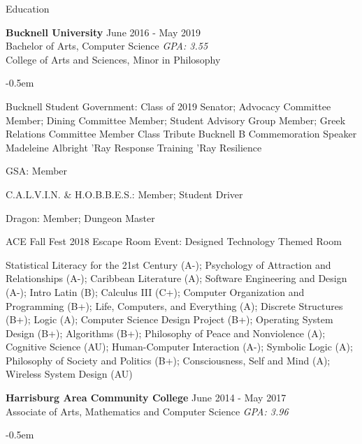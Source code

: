 \documentclass{resume} %
\begin{document}

\begin{rSection}{Education}

{\bf Bucknell University} {June 2016 - May 2019} 
\\ Bachelor of Arts, Computer Science  {\em GPA: 3.55}
\\ College of Arts and Sciences, Minor in Philosophy 
\begin{rSubSection}{}{
   \itemsep -0.5em \vspace{-0.5em} %
 
    \item {Bucknell Student Government:} Class of 2019 Senator; Advocacy Committee Member; Dining Committee Member; Student Advisory Group Member; Greek Relations Committee Member
    \subitem Class Tribute Bucknell B 
    \subitem Commemoration Speaker Madeleine Albright
    \subitem 'Ray Response Training
    \subitem 'Ray Resilience
    \item {GSA:} Member
    \item {C.A.L.V.I.N. \& H.O.B.B.E.S.:} Member; Student Driver
    \item {Dragon:} Member; Dungeon Master
    \item {ACE} 
    \subitem Fall Fest 2018
     Escape Room Event: Designed Technology Themed Room}
    
  \end{rSubSection}
Statistical Literacy for the 21st Century (A-); Psychology of Attraction and Relationships (A-); Caribbean Literature (A); Software Engineering and Design (A-); Intro Latin (B); Calculus III (C+); Computer Organization and Programming (B+); Life, Computers, and Everything (A); Discrete Structures (B+); Logic (A); Computer Science Design Project (B+); Operating System Design (B+); Algorithms (B+); Philosophy of Peace and Nonviolence (A); Cognitive Science (AU); Human-Computer Interaction (A-); Symbolic Logic (A); Philosophy of Society and Politics (B+); Consciousness, Self and Mind (A); Wireless System Design (AU)


{\bf Harrisburg Area Community College} {June 2014 - May 2017} 
\\ Associate of Arts, Mathematics and Computer Science {\em GPA: 3.96}
\begin{rSubSection}{}{
   \itemsep -0.5em \vspace{-0.5em} %
   
}
\end{rSubSection}
\end{rSection}
\end{document}
